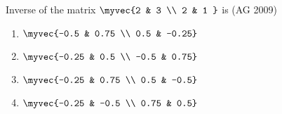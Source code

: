 \item Inverse of the matrix $\myvec{2 & 3 \\ 2 & 1 }$ is
\hfill(AG 2009)
\begin{multicols}{4}
\begin{enumerate}
\item $\myvec{-0.5 & 0.75 \\ 0.5 & -0.25} $
\item $\myvec{-0.25 & 0.5 \\ -0.5 & 0.75}$
\item $\myvec{-0.25 & 0.75 \\ 0.5 & -0.5}$
\item $\myvec{-0.25 & -0.5 \\ 0.75 & 0.5}$
\end{enumerate}
\end{multicols}

